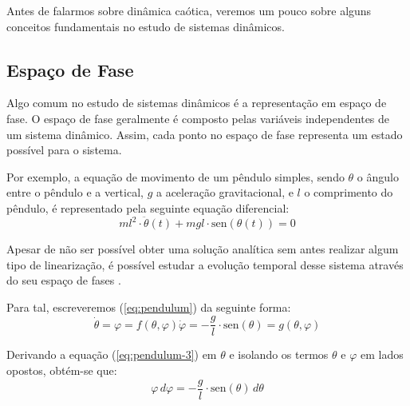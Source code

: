 \documentclass[a4paper, 12pt]{article}
\newcommand{\sen}{\text{sen}}
\begin{document}
Antes de falarmos sobre dinâmica caótica, veremos um pouco sobre alguns conceitos fundamentais no estudo de sistemas dinâmicos.

\subsection{Espaço de Fase}

Algo comum no estudo de sistemas dinâmicos é a representação em espaço de fase. O espaço de fase geralmente é composto pelas variáveis independentes de um sistema dinâmico. Assim, cada ponto no espaço de fase representa um estado possível para o sistema.

Por exemplo, a equação de movimento de um pêndulo simples, sendo $\theta$ o ângulo entre o pêndulo e a vertical, $g$ a aceleração gravitacional, e $l$ o comprimento do pêndulo, é representado pela seguinte equação diferencial:
\begin{equation}\label{eq:pendulum}
m l^2 \cdot \ddot{\theta}(t) + mgl\cdot  \sen(\theta(t)) = 0
\end{equation}

Apesar de não ser possível obter uma solução analítica sem antes realizar algum tipo de linearização, é possível estudar a evolução temporal desse sistema através do seu espaço de fases \cite{fiedler1994caos}.

Para tal, escreveremos (\ref{eq:pendulum}) da seguinte forma:
\begin{subequations}
\begin{equation}\label{eq:pendulum-2}
\dot{\theta} = \varphi = f(\theta, \varphi)
\end{equation}
\begin{equation}\label{eq:pendulum-3}
\dot{\varphi} = -\frac{g}{l} \cdot \sen(\theta) = g(\theta, \varphi)
\end{equation}
\end{subequations}

Derivando a equação (\ref{eq:pendulum-3}) em $\theta$ e isolando os termos $\theta$ e $\varphi$ em lados opostos, obtém-se que:
\begin{equation}\label{eq:pendulum-4}
\varphi \, d\varphi = -\frac{g}{l} \cdot \sen(\theta) \, d\theta
\end{equation}
\end{document}
